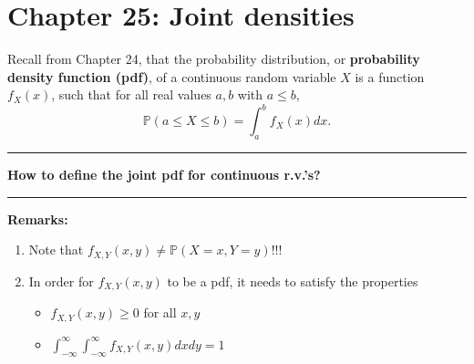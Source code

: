 \documentclass[12pt]{amsart}
\newcommand\pdfXY{f_{X,Y}(x,y)}
\newcommand\intd{\displaystyle\int}
\begin{document}
\setcounter{section}{25}
{\huge  
\section*{Chapter 25: Joint densities}
}

{\large %




\vspace{.5cm}

Recall from Chapter 24, that the probability distribution, or \textbf{probability density function (pdf)}, of a continuous random variable $X$ is a function $f_X(x)$, such that for all real values $a,b$ with $a \leq b$,
$$
\mathbb{P}(a \leq X \leq b) = \int_a^b f_X(x)dx.
$$



\vspace{.5cm}
\hrule
\vspace{.5cm}


\textbf{How to define the joint pdf for continuous r.v.'s?}

\vspace{9cm}

\vspace{.5cm}
\hrule
\vspace{.5cm}

\textbf{Remarks:}
\begin{enumerate}
\item Note that $\pdfXY \neq \mathbb{P}(X=x, Y=y)$!!!
\vspace{.5cm}
\item In order for $\pdfXY$ to be a pdf, it needs to satisfy the properties 
	\begin{itemize}
	\item $\pdfXY \geq 0$ for all $x,y$
	\item $\intd_{-\infty}^{\infty}\intd_{-\infty}^{\infty} \pdfXY dxdy=1$
	\end{itemize}
\end{enumerate}


}
\end{document}
